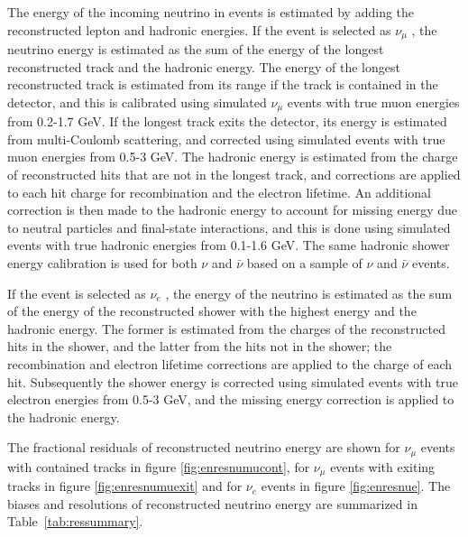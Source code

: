 The energy of the incoming neutrino in  events is estimated by adding the reconstructed lepton and hadronic energies. 
If the event is selected as $\nu_{\mu}$ , the neutrino energy is estimated as the sum of the energy of the longest reconstructed track and the hadronic energy. The energy of the longest reconstructed track is estimated from its range if the track is contained in the detector, and this is calibrated using simulated $\nu_{\mu}$  events with true muon energies from 0.2-1.7 GeV. If the longest track exits the detector, its energy is estimated from multi-Coulomb scattering, and corrected using simulated events with true muon energies from 0.5-3 GeV. The hadronic energy is estimated from the charge of reconstructed hits that are not in the longest track, and corrections are applied to each hit charge for recombination and the electron lifetime. An additional correction is then made to the hadronic energy to account for missing energy due to neutral particles and final-state interactions, and this is done using simulated events with true hadronic energies from 0.1-1.6 GeV. The same hadronic shower energy calibration is used for both $\nu$ and $\bar{\nu}$ based on a sample of $\nu$ and $\bar{\nu}$ events.

If the event is selected as $\nu_{e}$ , the energy of the 
neutrino is estimated as the sum of the energy of the reconstructed shower with the highest energy and the hadronic energy. The former is estimated from the charges of the reconstructed hits in the shower, and the latter from the hits not in the shower; the recombination and electron lifetime corrections are applied to the charge of each hit. Subsequently the shower energy is corrected using simulated events with true electron energies from 0.5-3 GeV, and the missing energy correction is applied to the hadronic energy.

The fractional residuals of reconstructed neutrino energy are shown for $\nu_{\mu}$  events with contained tracks in figure \ref{fig:enresnumucont}, for $\nu_{\mu}$  events with exiting tracks in figure \ref{fig:enresnumuexit} and for $\nu_{e}$  events in figure \ref{fig:enresnue}. The biases and resolutions of reconstructed neutrino energy are summarized in Table~\ref{tab:ressummary}.


